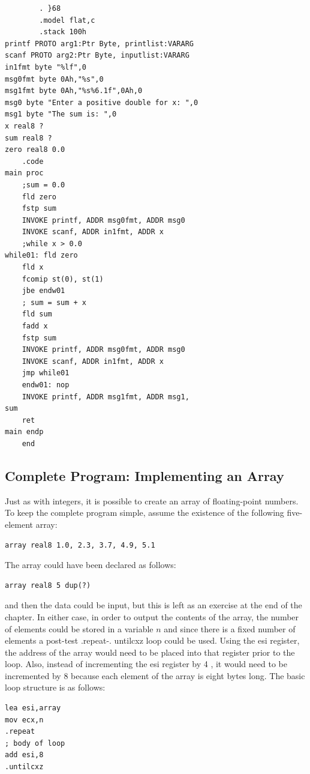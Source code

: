 \documentclass[10pt]{book}
\begin{document}
\begin{verbatim}
        . }68
        .model flat,c
        .stack 100h
printf PROTO arg1:Ptr Byte, printlist:VARARG
scanf PROTO arg2:Ptr Byte, inputlist:VARARG
in1fmt byte "%lf",0
msg0fmt byte 0Ah,"%s",0
msg1fmt byte 0Ah,"%s%6.1f",0Ah,0
msg0 byte "Enter a positive double for x: ",0
msg1 byte "The sum is: ",0
x real8 ?
sum real8 ?
zero real8 0.0
    .code
main proc
    ;sum = 0.0
    fld zero
    fstp sum
    INVOKE printf, ADDR msg0fmt, ADDR msg0
    INVOKE scanf, ADDR in1fmt, ADDR x
    ;while x > 0.0
while01: fld zero
    fld x
    fcomip st(0), st(1)
    jbe endw01
    ; sum = sum + x
    fld sum
    fadd x
    fstp sum
    INVOKE printf, ADDR msg0fmt, ADDR msg0
    INVOKE scanf, ADDR in1fmt, ADDR x
    jmp while01
    endw01: nop
    INVOKE printf, ADDR msg1fmt, ADDR msg1,
sum
    ret
main endp
    end
\end{verbatim}

\subsection{Complete Program: Implementing an Array}
Just as with integers, it is possible to create an array of floating-point numbers. To keep the complete program simple, assume the existence of the following five-element array:


\begin{verbatim}
array real8 1.0, 2.3, 3.7, 4.9, 5.1
\end{verbatim}

The array could have been declared as follows:

\begin{verbatim}
array real8 5 dup(?)
\end{verbatim}

and then the data could be input, but this is left as an exercise at the end of the chapter. In either case, in order to output the contents of the array, the number of elements could be stored in a variable $n$ and since there is a fixed number of elements a post-test .repeat-. untilcxz loop could be used. Using the esi register, the address of the array would need to be placed into that register prior to the loop. Also, instead of incrementing the esi register by 4 , it would need to be incremented by 8 because each element of the array is eight bytes long. The basic loop structure is as follows:

\begin{verbatim}
lea esi,array
mov ecx,n
.repeat
; body of loop
add esi,8
.untilcxz
\end{verbatim}
\end{document}
